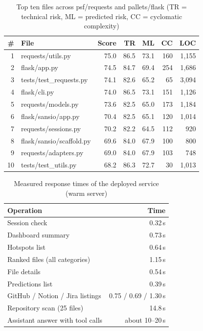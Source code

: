\documentclass[conference]{IEEEtran}
\begin{document}
\begin{table}[t]
\caption{Top ten files across psf/requests and pallets/flask (TR = technical risk, ML = predicted risk, CC = cyclomatic complexity)}
\label{tab:top10}
\centering
\scriptsize
\setlength{\tabcolsep}{2.4pt}
\begin{tabular}{@{}rlrrrrr@{}}
\toprule
\# & File & Score & TR & ML & CC & LOC \\
\midrule
1 & requests/utils.py & 75.0 & 86.5 & 73.1 & 160 & 1,155 \\
2 & flask/app.py & 74.5 & 84.7 & 69.4 & 254 & 1,686 \\
3 & tests/test\_requests.py & 74.1 & 82.6 & 65.2 & 65 & 3,094 \\
4 & flask/cli.py & 74.0 & 86.5 & 73.1 & 151 & 1,126 \\
5 & requests/models.py & 73.6 & 82.5 & 65.0 & 173 & 1,184 \\
6 & flask/sansio/app.py & 70.4 & 82.5 & 65.1 & 120 & 1,014 \\
7 & requests/sessions.py & 70.2 & 82.2 & 64.5 & 112 & 920 \\
8 & flask/sansio/scaffold.py & 69.6 & 84.0 & 67.9 & 100 & 800 \\
9 & requests/adapters.py & 69.0 & 84.0 & 67.9 & 103 & 748 \\
10 & tests/test\_utils.py & 68.2 & 86.3 & 72.7 & 30 & 1,013 \\
\bottomrule
\end{tabular}
\end{table}

\begin{table}[t]
\caption{Measured response times of the deployed service (warm server)}
\label{tab:times}
\centering
\footnotesize
\begin{tabular}{@{}lr@{}}
\toprule
Operation & Time \\
\midrule
Session check & 0.32\,s \\
Dashboard summary & 0.73\,s \\
Hotspots list & 0.64\,s \\
Ranked files (all categories) & 1.15\,s \\
File details & 0.54\,s \\
Predictions list & 0.39\,s \\
GitHub / Notion / Jira listings & 0.75 / 0.69 / 1.30\,s \\
Repository scan (25 files) & 14.8\,s \\
Assistant answer with tool calls & about 10--20\,s \\
\bottomrule
\end{tabular}
\end{table}
\end{document}
